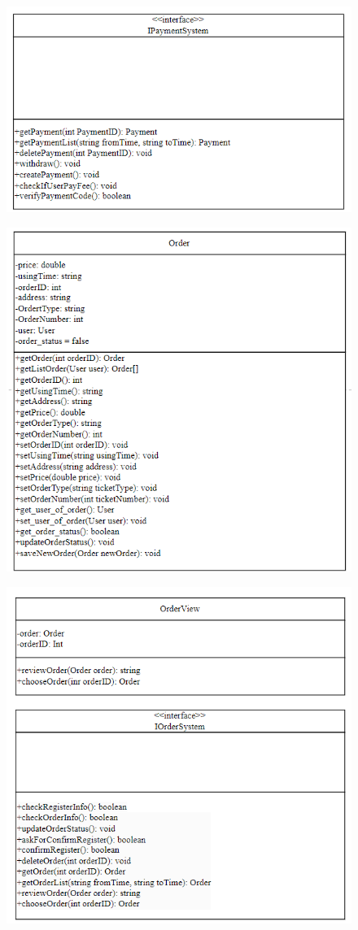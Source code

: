 \begin{figure}[H]
    \centering
    \includegraphics[width=0.8\linewidth]{img3.6/11.png}
\end{figure}
\begin{figure}[H]
    \centering
    \includegraphics[width=0.8\linewidth]{img3.6/12.png}
\end{figure}
\begin{figure}[H]
    \centering
    \includegraphics[width=\linewidth]{img3.6/13.png}
\end{figure}
